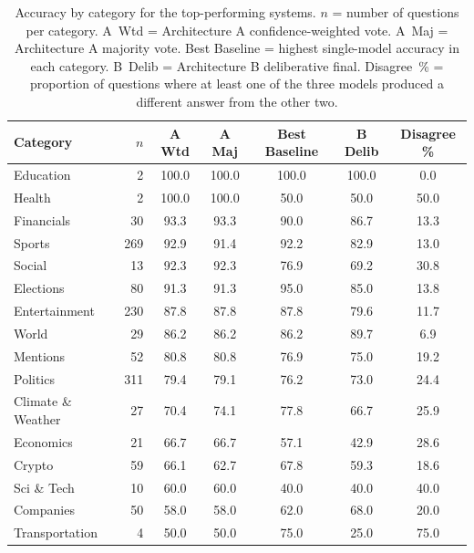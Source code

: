 \begin{table}[t]
\centering
\small
\begin{tabular}{lrccccc}
\toprule
\textbf{Category} & $n$ & \textbf{A Wtd} & \textbf{A Maj} & \textbf{Best Baseline} & \textbf{B Delib} & \textbf{Disagree \%} \\
\midrule
Education           &   2 & 100.0 & 100.0 & 100.0 & 100.0 &  0.0 \\
Health              &   2 & 100.0 & 100.0 &  50.0 &  50.0 & 50.0 \\
Financials          &  30 &  93.3 &  93.3 &  90.0 &  86.7 & 13.3 \\
Sports              & 269 &  92.9 &  91.4 &  92.2 &  82.9 & 13.0 \\
Social              &  13 &  92.3 &  92.3 &  76.9 &  69.2 & 30.8 \\
Elections           &  80 &  91.3 &  91.3 &  95.0 &  85.0 & 13.8 \\
Entertainment       & 230 &  87.8 &  87.8 &  87.8 &  79.6 & 11.7 \\
World               &  29 &  86.2 &  86.2 &  86.2 &  89.7 &  6.9 \\
Mentions            &  52 &  80.8 &  80.8 &  76.9 &  75.0 & 19.2 \\
Politics            & 311 &  79.4 &  79.1 &  76.2 &  73.0 & 24.4 \\
Climate \& Weather  &  27 &  70.4 &  74.1 &  77.8 &  66.7 & 25.9 \\
Economics           &  21 &  66.7 &  66.7 &  57.1 &  42.9 & 28.6 \\
Crypto              &  59 &  66.1 &  62.7 &  67.8 &  59.3 & 18.6 \\
Sci \& Tech         &  10 &  60.0 &  60.0 &  40.0 &  40.0 & 40.0 \\
Companies           &  50 &  58.0 &  58.0 &  62.0 &  68.0 & 20.0 \\
Transportation      &   4 &  50.0 &  50.0 &  75.0 &  25.0 & 75.0 \\
\bottomrule
\end{tabular}
\caption{Accuracy by category for the top-performing systems. $n$ = number of questions per category. A~Wtd = Architecture A confidence-weighted vote. A~Maj = Architecture A majority vote. Best Baseline = highest single-model accuracy in each category. B~Delib = Architecture B deliberative final. Disagree~\% = proportion of questions where at least one of the three models produced a different answer from the other two.}
\label{tab:category}
\end{table}

